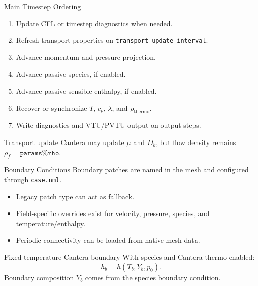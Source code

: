 \documentclass[aspectratio=169,11pt]{beamer}
\begin{document}
\begin{frame}{Main Timestep Ordering}
  \begin{enumerate}
    \item Update CFL or timestep diagnostics when needed.
    \item Refresh transport properties on \texttt{transport\_update\_interval}.
    \item Advance momentum and pressure projection.
    \item Advance passive species, if enabled.
    \item Advance passive sensible enthalpy, if enabled.
    \item Recover or synchronize \(T\), \(c_p\), \(\lambda\), and
          \(\rho_{\mathrm{thermo}}\).
    \item Write diagnostics and VTU/PVTU output on output steps.
  \end{enumerate}

  \begin{block}{Transport update}
    Cantera may update \(\mu\) and \(D_k\), but flow density remains
    \(\rho_f=\texttt{params\%rho}\).
  \end{block}
\end{frame}

\begin{frame}{Boundary Conditions}
  Boundary patches are named in the mesh and configured through
  \texttt{case.nml}.

  \begin{itemize}
    \item Legacy patch type can act as fallback.
    \item Field-specific overrides exist for velocity, pressure, species, and
          temperature/enthalpy.
    \item Periodic connectivity can be loaded from native mesh data.
  \end{itemize}

  \begin{block}{Fixed-temperature Cantera boundary}
    With species and Cantera thermo enabled:
    \[
      h_b = h(T_b,Y_b,p_0).
    \]
    Boundary composition \(Y_b\) comes from the species boundary condition.
  \end{block}
\end{frame}
\end{document}

